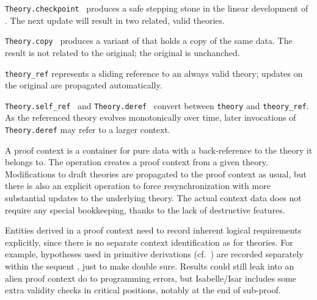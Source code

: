 \begin{isabellebody}
\begin{isamarkuptext}
\begin{description}
  \item \verb|Theory.checkpoint|~ produces a safe
  stepping stone in the linear development of .  The next
  update will result in two related, valid theories.

  \item \verb|Theory.copy|~ produces a variant of  that holds a copy of the same data.  The result is not
  related to the original; the original is unchanched.

  \item \verb|theory_ref| represents a sliding reference to an
  always valid theory; updates on the original are propagated
  automatically.

  \item \verb|Theory.self_ref|~ and \verb|Theory.deref|~ convert between \verb|theory| and \verb|theory_ref|.  As the referenced theory
  evolves monotonically over time, later invocations of \verb|Theory.deref| may refer to a larger context.

  \end{description}%
\end{isamarkuptext}%
\isamarkuptrue%
%
\endisatagmlref
{\isafoldmlref}%
%
\isadelimmlref
%
\endisadelimmlref
%
\isamarkuptrue%
%
\begin{isamarkuptext}%

  A proof context is a container for pure data with a back-reference
  to the theory it belongs to.  The  operation creates a
  proof context from a given theory.  Modifications to draft theories
  are propagated to the proof context as usual, but there is also an
  explicit  operation to force resynchronization
  with more substantial updates to the underlying theory.  The actual
  context data does not require any special bookkeeping, thanks to the
  lack of destructive features.

  Entities derived in a proof context need to record inherent logical
  requirements explicitly, since there is no separate context
  identification as for theories.  For example, hypotheses used in
  primitive derivations (cf.\ ) are recorded
  separately within the sequent \isa{{\isasymGamma}\ {\isasymturnstile}\ {\isasymphi}}, just to make double
  sure.  Results could still leak into an alien proof context do to
  programming errors, but Isabelle/Isar includes some extra validity
  checks in critical positions, notably at the end of sub-proof.


\end{isamarkuptext}
\end{isabellebody}
